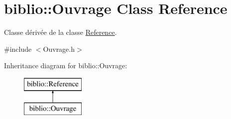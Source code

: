 \hypertarget{classbiblio_1_1Ouvrage}{}\section{biblio\+:\+:Ouvrage Class Reference}
\label{classbiblio_1_1Ouvrage}


Classe dérivée de la classe \hyperlink{classbiblio_1_1Reference}{Reference}.  




{\ttfamily \#include $<$Ouvrage.\+h$>$}

Inheritance diagram for biblio\+:\+:Ouvrage\+:\begin{figure}[H]
\begin{center}
\leavevmode
\includegraphics[height=2.000000cm]{classbiblio_1_1Ouvrage}
\end{center}
\end{figure}
